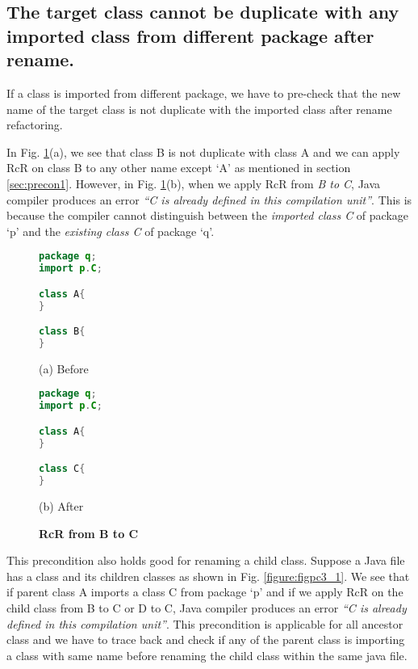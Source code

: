 \subsection{The target class cannot be duplicate with any imported class from different package after rename.}

If a class is imported from different package, we have to pre-check that the new name of the target class is not duplicate with the imported class after rename refactoring. 

In Fig. \ref{figure:fig2}(a), we see that class B is not duplicate with class A and we can apply RcR on class B to any other name except `A' as mentioned in section \ref{sec:precon1}. However, in Fig. \ref{figure:fig2}(b), when we apply RcR from \emph{B to C}, Java compiler produces an error \textit{``C is already defined in this compilation unit''}. This is because the compiler cannot distinguish between the \emph{imported class C} of package `p' and the \emph{existing class C} of package `q'. 

\begin{figure}[th]
\centering
\begin{minipage}[t]{0.4\linewidth}
\begin{lstlisting}[language=java, basicstyle=\scriptsize\ttfamily,frame=single]
package q;
import p.C;

class A{
}

class B{
} 
\end{lstlisting}
\centering(a) Before
\end{minipage}
\hfill
\begin{minipage}[t]{0.4\linewidth}
\begin{lstlisting}[language=java, basicstyle=\scriptsize\ttfamily,frame=single]
package q;
import p.C;

class A{
}

class C{
} 
\end{lstlisting}
\centering(b) After
\end{minipage}
\caption{\textbf{RcR from B to C}}
\label{figure:fig2}
\end{figure}


This precondition also holds good for renaming a child class. Suppose a Java file has a class and its children classes as shown in Fig. \ref{figure:figpc3_1}. We see that if parent class A imports a class C from package `p' and if we apply RcR on the child class from B to C or D to C, Java compiler produces an error \textit{``C is already defined in this compilation unit''}.  This precondition is applicable for all ancestor class and we have to trace back and check if any of the parent class is importing a class with same name before renaming the child class within the same java file.

